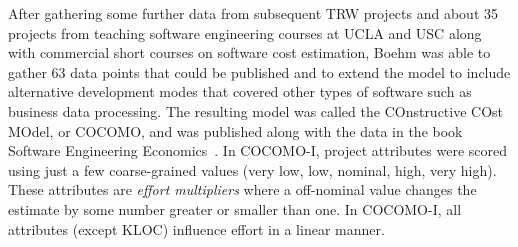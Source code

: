\documentclass[smallcondesed]{svjour3}
\begin{document}




After  gathering some further data from subsequent
TRW projects and about 35 projects from teaching
software engineering courses at UCLA and USC along
with commercial short courses on software cost
estimation, Boehm was able to gather 63 data points
that could be published and to extend the model to
include alternative development modes that covered
other types of software such as business data
processing.  The resulting model was called the
COnstructive COst MOdel, or COCOMO, and was
published along with the data in the book Software
Engineering Economics~\cite{boehm81}. 
In COCOMO-I, project attributes
were scored using just a few coarse-grained values (very low,
low, nominal, high, very high). These attributes
are {\em effort multipliers} where
a off-nominal value changes the estimate by some number
greater or smaller than one.
In COCOMO-I, all attributes (except KLOC)
influence effort in a linear manner.
\end{document}
